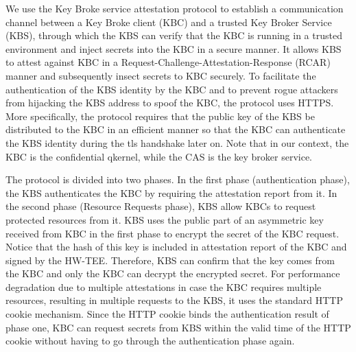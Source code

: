 We use the Key Broke service attestation protocol to establish a communication channel between a Key Broke client (KBC) and a trusted Key Broker Service (KBS), 
through which the KBS can verify that the KBC is running in a trusted environment and inject secrets into the KBC in a secure manner. It allows KBS to attest against KBC in a Request-Challenge-Attestation-Response (RCAR) manner and subsequently insect secrets to KBC securely. 
To facilitate the authentication of the KBS identity by the KBC and to prevent rogue attackers from hijacking the KBS address to spoof the KBC, the protocol uses HTTPS. More specifically, the protocol requires that the public key of the KBS be distributed to the KBC in an efficient manner so that 
the KBC can authenticate the KBS identity during the tls handshake later on.  Note that in our context, the KBC is the confidential qkernel, while the CAS is the key broker service.

The protocol is divided into two phases. In the first phase (authentication phase), the KBS authenticates the KBC by requiring the attestation report from it. In the second phase (Resource Requests phase), KBS allow KBCs to request protected resources from it. 
KBS uses the public part of an asymmetric key received from KBC in the first phase to encrypt the secret of the KBC request. Notice that the hash of this key is included in attestation report of the KBC and signed by the HW-TEE. Therefore, KBS 
can confirm that the key comes from the KBC and only the KBC can decrypt the encrypted secret. For performance degradation due to multiple attestations in case the KBC requires multiple resources, resulting in multiple requests to the KBS, 
it uses the standard HTTP cookie mechanism.  Since the HTTP cookie binds the authentication result of phase one, KBC can request secrets from KBS within the valid time of the HTTP cookie without having to go through the authentication phase again.

